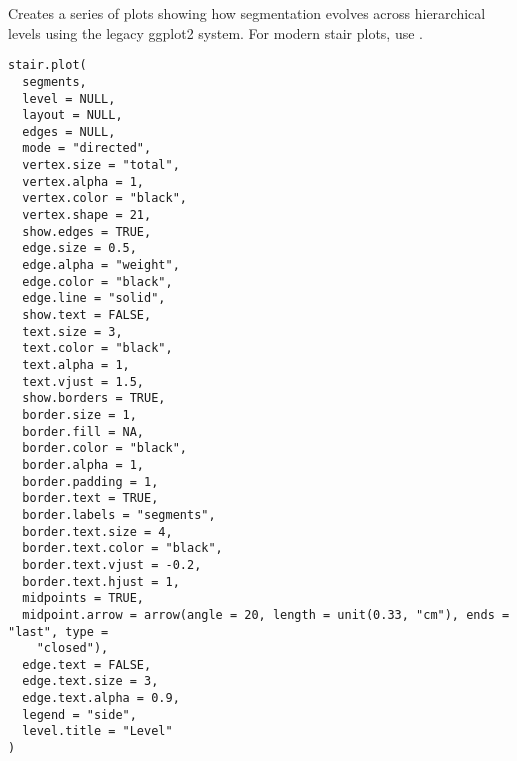 \documentclass[a4paper]{book}
\begin{document}
%
\begin{Description}
Creates a series of plots showing how segmentation evolves across hierarchical
levels using the legacy ggplot2 system. For modern stair plots, use
.
\end{Description}
%
\begin{Usage}
\begin{verbatim}
stair.plot(
  segments,
  level = NULL,
  layout = NULL,
  edges = NULL,
  mode = "directed",
  vertex.size = "total",
  vertex.alpha = 1,
  vertex.color = "black",
  vertex.shape = 21,
  show.edges = TRUE,
  edge.size = 0.5,
  edge.alpha = "weight",
  edge.color = "black",
  edge.line = "solid",
  show.text = FALSE,
  text.size = 3,
  text.color = "black",
  text.alpha = 1,
  text.vjust = 1.5,
  show.borders = TRUE,
  border.size = 1,
  border.fill = NA,
  border.color = "black",
  border.alpha = 1,
  border.padding = 1,
  border.text = TRUE,
  border.labels = "segments",
  border.text.size = 4,
  border.text.color = "black",
  border.text.vjust = -0.2,
  border.text.hjust = 1,
  midpoints = TRUE,
  midpoint.arrow = arrow(angle = 20, length = unit(0.33, "cm"), ends = "last", type =
    "closed"),
  edge.text = FALSE,
  edge.text.size = 3,
  edge.text.alpha = 0.9,
  legend = "side",
  level.title = "Level"
)
\end{verbatim}
\end{Usage}
%
\end{document}
